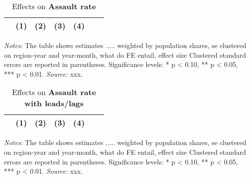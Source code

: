 \documentclass[11pt, a4paper]{article} %
\begin{document}
\vspace*{\fill}
\begin{table}[H] \centering 
	\begin{threeparttable} \centering \caption{Effects on \textbf{Assault rate}}\label{tab_soc_ext:reg_fe_assrate}
		{\def\sym#1{\ifmmode^{#1}\else\(^{#1}\)\fi} 
			\begin{tabular}{l*{6}{c}}
				\toprule 
				&\multicolumn{1}{c}{(1)}&\multicolumn{1}{c}{(2)}&\multicolumn{1}{c}{(3)}&\multicolumn{1}{c}{(4)}\\
				\midrule
				 
				\bottomrule 
		\end{tabular}}
		\begin{tablenotes} 
			\item \scriptsize \emph{Notes:} The table shows estimates ..... 
			weighted by population shares, se clustered on region-year and year-month, what do FE entail, effect size
			Clustered standard errors are reported in parentheses. \newline Significance levels: * p < 0.10, ** p < 0.05, *** p < 0.01. \newline 	\emph{Source:} xxx.
		\end{tablenotes} 
	\end{threeparttable} 
\end{table}
\vspace*{\fill}\clearpage 


\vspace*{\fill}
\begin{table}[H] \centering 
	\begin{threeparttable} \centering \caption{Effects on \textbf{Assault rate with leads/lags}}\label{tab_soc_ext:reg_fe_assrate_leads_lags}
		{\def\sym#1{\ifmmode^{#1}\else\(^{#1}\)\fi} 
			\begin{tabular}{l*{6}{c}}
				\toprule 
				&\multicolumn{1}{c}{(1)}&\multicolumn{1}{c}{(2)}&\multicolumn{1}{c}{(3)}&\multicolumn{1}{c}{(4)}\\
				\midrule
				 
				\bottomrule 
		\end{tabular}}
		\begin{tablenotes} 
			\item \scriptsize \emph{Notes:} The table shows estimates ..... 
			weighted by population shares, se clustered on region-year and year-month, what do FE entail, effect size
			Clustered standard errors are reported in parentheses. \newline Significance levels: * p < 0.10, ** p < 0.05, *** p < 0.01. \newline 	\emph{Source:} xxx.
		\end{tablenotes} 
	\end{threeparttable} 
\end{table}
\vspace*{\fill}\clearpage 
\end{document}
